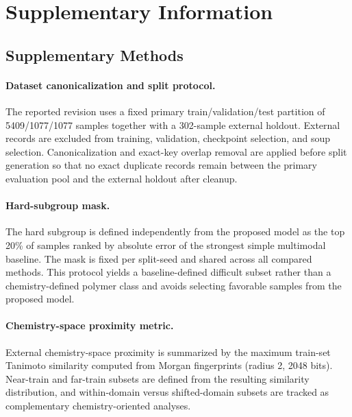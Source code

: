 \documentclass[11pt]{article}
\begin{document}
\section*{Supplementary Information}

\subsection*{Supplementary Methods}

\paragraph{Dataset canonicalization and split protocol.}
The reported revision uses a fixed primary train/validation/test partition of
5409/1077/1077 samples together with a 302-sample external holdout. External
records are excluded from training, validation, checkpoint selection, and soup
selection. Canonicalization and exact-key overlap removal are applied before
split generation so that no exact duplicate records remain between the primary
evaluation pool and the external holdout after cleanup.

\paragraph{Hard-subgroup mask.}
The hard subgroup is defined independently from the proposed model as the top
20\% of samples ranked by absolute error of the strongest simple multimodal
baseline. The mask is fixed per split-seed and shared across all compared
methods. This protocol yields a baseline-defined difficult subset rather than a
chemistry-defined polymer class and avoids selecting favorable samples from the
proposed model.

\paragraph{Chemistry-space proximity metric.}
External chemistry-space proximity is summarized by the maximum train-set
Tanimoto similarity computed from Morgan fingerprints (radius 2, 2048 bits).
Near-train and far-train subsets are defined from the resulting similarity
distribution, and within-domain versus shifted-domain subsets are tracked as
complementary chemistry-oriented analyses.
\end{document}
